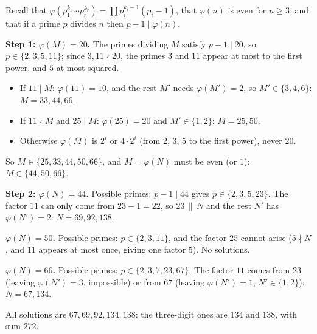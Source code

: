 Recall that $\varphi\left(p_1^{k_1}\cdots p_r^{k_r}\right)=\prod p_i^{k_i-1}(p_i-1)$, that $\varphi(n)$ is even for $n\ge3$, and that if a prime $p$ divides $n$ then $p-1\mid\varphi(n)$.

\textbf{Step 1: $\varphi(M)=20$.} The primes dividing $M$ satisfy $p-1\mid20$, so $p\in\{2,3,5,11\}$; since $3,11\nmid20$, the primes $3$ and $11$ appear at most to the first power, and $5$ at most squared.
\begin{itemize}
\item If $11\mid M$: $\varphi(11)=10$, and the rest $M'$ needs $\varphi(M')=2$, so $M'\in\{3,4,6\}$: $M=33,44,66$.
\item If $11\nmid M$ and $25\mid M$: $\varphi(25)=20$ and $M'\in\{1,2\}$: $M=25,50$.
\item Otherwise $\varphi(M)$ is $2^i$ or $4\cdot2^i$ (from $2$, $3$, $5$ to the first power), never $20$.
\end{itemize}
So $M\in\{25,33,44,50,66\}$, and $M=\varphi(N)$ must be even (or $1$): $M\in\{44,50,66\}$.

\textbf{Step 2: $\varphi(N)=44$.} Possible primes: $p-1\mid44$ gives $p\in\{2,3,5,23\}$. The factor $11$ can only come from $23-1=22$, so $23\,\|\,N$ and the rest $N'$ has $\varphi(N')=2$: $N=69,92,138$.

\textbf{$\varphi(N)=50$.} Possible primes: $p\in\{2,3,11\}$, and the factor $25$ cannot arise ($5\nmid N$, and $11$ appears at most once, giving one factor $5$). No solutions.

\textbf{$\varphi(N)=66$.} Possible primes: $p\in\{2,3,7,23,67\}$. The factor $11$ comes from $23$ (leaving $\varphi(N')=3$, impossible) or from $67$ (leaving $\varphi(N')=1$, $N'\in\{1,2\}$): $N=67,134$.

All solutions are $67,69,92,134,138$; the three-digit ones are $134$ and $138$, with sum $\boxed{272}$.
